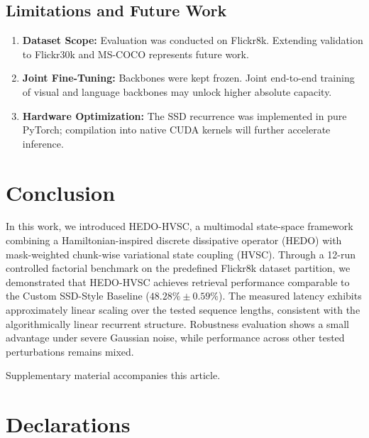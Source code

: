 \documentclass[pdflatex,sn-mathphys-num]{sn-jnl}%
\begin{document}
\subsection{Limitations and Future Work}
\begin{enumerate}
    \item \textbf{Dataset Scope:} Evaluation was conducted on Flickr8k. Extending validation to Flickr30k \cite{young2014image} and MS-COCO \cite{lin2014microsoft} represents future work.
    \item \textbf{Joint Fine-Tuning:} Backbones were kept frozen. Joint end-to-end training of visual and language backbones may unlock higher absolute capacity.
    \item \textbf{Hardware Optimization:} The SSD recurrence was implemented in pure PyTorch; compilation into native CUDA kernels will further accelerate inference.
\end{enumerate}

\section{Conclusion}
\label{sec:conclusion}
In this work, we introduced HEDO-HVSC, a multimodal state-space framework combining a Hamiltonian-inspired discrete dissipative operator (HEDO) with mask-weighted chunk-wise variational state coupling (HVSC). Through a 12-run controlled factorial benchmark on the predefined Flickr8k dataset partition, we demonstrated that HEDO-HVSC achieves retrieval performance comparable to the Custom SSD-Style Baseline ($48.28\% \pm 0.59\%$). The measured latency exhibits approximately linear scaling over the tested sequence lengths, consistent with the algorithmically linear recurrent structure. Robustness evaluation shows a small advantage under severe Gaussian noise, while performance across other tested perturbations remains mixed.

\backmatter


Supplementary material accompanies this article.

\section*{Declarations}
\end{document}
